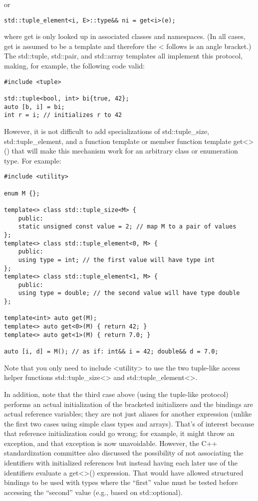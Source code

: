 \begin{enumerate}
or

\begin{lstlisting}[style=styleCXX]
std::tuple_element<i, E>::type&& ni = get<i>(e);
\end{lstlisting}

where get is only looked up in associated classes and namespaces. (In all cases, get is assumed to be a template and therefore the < follows is an angle bracket.) The std::tuple, std::pair, and std::array templates all implement this protocol, making, for example, the following code valid:

\begin{lstlisting}[style=styleCXX]
#include <tuple>

std::tuple<bool, int> bi{true, 42};
auto [b, i] = bi;
int r = i; // initializes r to 42
\end{lstlisting}

However, it is not difficult to add specializations of std::tuple\_size, std::tuple\_element, and a function template or member function template get<>() that will make this mechanism work for an arbitrary class or enumeration type. For example:

\begin{lstlisting}[style=styleCXX]
#include <utility>

enum M {};

template<> class std::tuple_size<M> {
	public:
	static unsigned const value = 2; // map M to a pair of values
};
template<> class std::tuple_element<0, M> {
	public:
	using type = int; // the first value will have type int
};
template<> class std::tuple_element<1, M> {
	public:
	using type = double; // the second value will have type double
};

template<int> auto get(M);
template<> auto get<0>(M) { return 42; }
template<> auto get<1>(M) { return 7.0; }

auto [i, d] = M(); // as if: int&& i = 42; double&& d = 7.0;
\end{lstlisting}

\end{enumerate}

Note that you only need to include <utility> to use the two tuple-like access helper functions std::tuple\_size<> and std::tuple\_element<>.

In addition, note that the third case above (using the tuple-like protocol) performs an actual initialization of the bracketed initializers and the bindings are actual reference variables; they are not just aliases for another expression (unlike the first two cases using simple class types and arrays). That’s of interest because that reference initialization could go wrong; for example, it might throw  an exception, and that exception is now unavoidable. However, the C++ standardization committee also discussed the possibility of not associating the identifiers with initialized references but instead having each later use of the identifiers evaluate a get<>() expression. That would have allowed structured bindings to be used with types where the “first” value must be tested before accessing the “second” value (e.g., based on std::optional).


